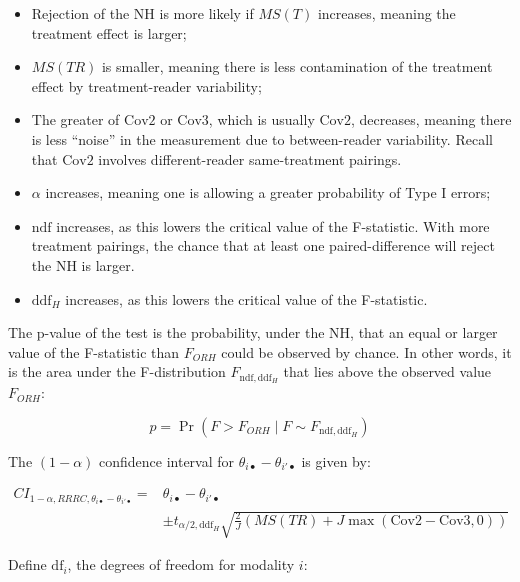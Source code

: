 \documentclass[
]{book}
\begin{document}
\begin{itemize}
\item
  Rejection of the NH is more likely if \(MS(T)\) increases, meaning the treatment effect is larger;
\item
  \(MS(TR)\) is smaller, meaning there is less contamination of the treatment effect by treatment-reader variability;
\item
  The greater of \(\text{Cov2}\) or \(\text{Cov3}\), which is usually \(\text{Cov2}\), decreases, meaning there is less ``noise'' in the measurement due to between-reader variability. Recall that \(\text{Cov2}\) involves different-reader same-treatment pairings.\\
\item
  \(\alpha\) increases, meaning one is allowing a greater probability of Type I errors;
\item
  \(\text{ndf}\) increases, as this lowers the critical value of the F-statistic. With more treatment pairings, the chance that at least one paired-difference will reject the NH is larger.
\item
  \(\text{ddf}_H\) increases, as this lowers the critical value of the F-statistic.
\end{itemize}

The p-value of the test is the probability, under the NH, that an equal or larger value of the F-statistic than \(F_{ORH}\) could be observed by chance. In other words, it is the area under the F-distribution \(F_{\text{ndf},\text{ddf}_H}\) that lies above the observed value \(F_{ORH}\):

\begin{equation}
p=\Pr(F>F_{ORH} \mid F\sim F_{\text{ndf},\text{ddf}_H})
\label{eq:pValueOR-RRRC}
\end{equation}

The \((1-\alpha)\) confidence interval for \(\theta_{i \bullet} - \theta_{i' \bullet}\) is given by:

\begin{equation}
\begin{split}
CI_{1-\alpha,RRRC,\theta_{i \bullet} - \theta_{i' \bullet}} =& \theta_{i \bullet} - \theta_{i' \bullet} \\ 
&\pm t_{\alpha/2, \text{ddf}_H}\sqrt{\textstyle\frac{2}{J}(MS(TR)+J\max(\text{Cov2}-\text{Cov3},0))}
\end{split}
\label{eq:CI-DiffFomRRRC}
\end{equation}

Define \(\text{df}_i\), the degrees of freedom for modality \(i\):
\end{document}
